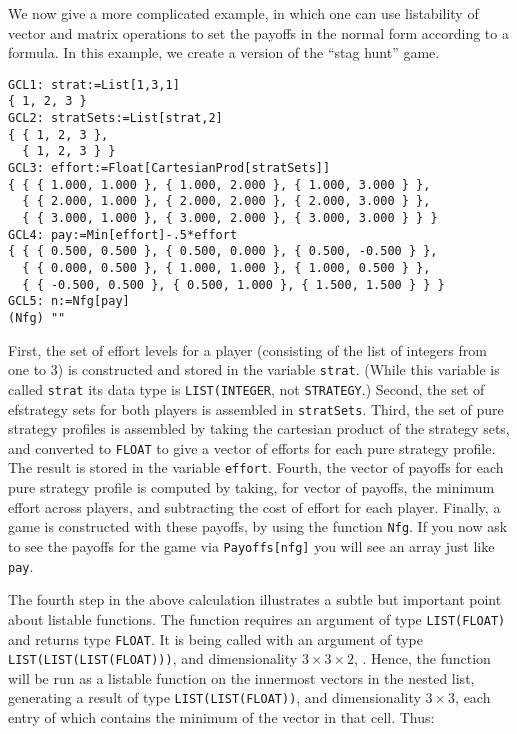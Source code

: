 We now give a more complicated example, in which one can use
listability of vector and matrix operations to set the payoffs in the
normal form according to a formula.  In this example, we create a
version of the ``stag hunt'' game.

\begin{verbatim}
GCL1: strat:=List[1,3,1]
{ 1, 2, 3 }
GCL2: stratSets:=List[strat,2]
{ { 1, 2, 3 },
  { 1, 2, 3 } }
GCL3: effort:=Float[CartesianProd[stratSets]] 
{ { { 1.000, 1.000 }, { 1.000, 2.000 }, { 1.000, 3.000 } },
  { { 2.000, 1.000 }, { 2.000, 2.000 }, { 2.000, 3.000 } },
  { { 3.000, 1.000 }, { 3.000, 2.000 }, { 3.000, 3.000 } } }
GCL4: pay:=Min[effort]-.5*effort
{ { { 0.500, 0.500 }, { 0.500, 0.000 }, { 0.500, -0.500 } },
  { { 0.000, 0.500 }, { 1.000, 1.000 }, { 1.000, 0.500 } },
  { { -0.500, 0.500 }, { 0.500, 1.000 }, { 1.500, 1.500 } } }
GCL5: n:=Nfg[pay]
(Nfg) ""
\end{verbatim}

First, the set of effort levels for a player (consisting of the list
of integers from one to 3) is constructed and stored in the variable
\verb+strat+.  (While this variable is called \verb+strat+ its data
type is \verb+LIST(INTEGER+, not \verb+STRATEGY+.)  Second, the set
of efstrategy sets for both players is assembled in \verb+stratSets+.
Third, the set of pure strategy profiles is assembled by taking the
cartesian product of the strategy sets, and converted to \verb+FLOAT+
to give a vector of efforts for each pure strategy profile.  The
result is stored in the variable \verb+effort+.  Fourth, the vector of
payoffs for each pure strategy profile is computed by taking, for
vector of payoffs, the minimum effort across players, and subtracting
the cost of effort for each player.  Finally, a game is constructed
with these payoffs, by using the function \verb+Nfg+.  If you now ask
to see the payoffs for the game via \verb+Payoffs[nfg]+ you will see
an array just like \verb+pay+.  

The fourth step in the above calculation illustrates a subtle but
important point about listable functions.  The function 
requires an argument of type \verb+LIST(FLOAT)+ and returns type
\verb+FLOAT+.  It is being called with an argument of type
\verb+LIST(LIST(LIST(FLOAT)))+, and dimensionality $3\times 3\times
2$, .  Hence, the function will be run as a listable function on the
innermost vectors in the nested list, generating a result of type
\verb+LIST(LIST(FLOAT))+, and dimensionality $3\times 3$, each entry
of which contains the minimum of the vector in that cell.  Thus:

